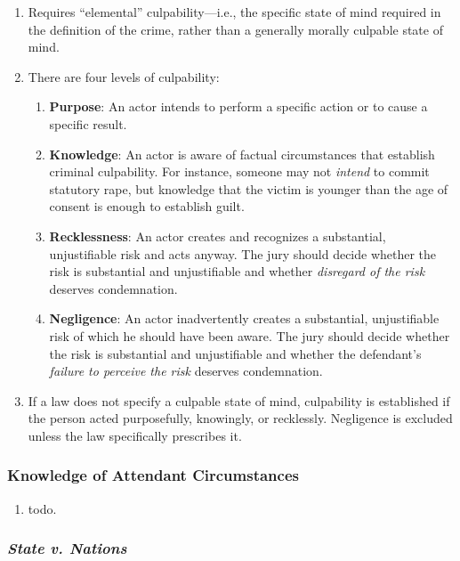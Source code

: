 \begin{enumerate}
    \item Requires ``elemental'' culpability---i.e., the specific state of mind required in the definition of the crime, rather than a generally morally culpable state of mind.
    \item There are four levels of culpability:
    \begin{enumerate}
        \item \textbf{Purpose}: An actor intends to perform a specific action or to cause a specific result.
        \item \textbf{Knowledge}: An actor is aware of factual circumstances that establish criminal culpability. For instance, someone may not \emph{intend} to commit statutory rape, but knowledge that the victim is younger than the age of consent is enough to establish guilt.
        \item \textbf{Recklessness}: An actor creates and recognizes a substantial, unjustifiable risk and acts anyway. The jury should decide whether the risk is substantial and unjustifiable and whether \emph{disregard of the risk} deserves condemnation. 
        \item \textbf{Negligence}: An actor inadvertently creates a substantial, unjustifiable risk of which he should have been aware. The jury should decide whether the risk is substantial and unjustifiable and whether the defendant's \emph{failure to perceive the risk} deserves condemnation.
    \end{enumerate}
    \item If a law does not specify a culpable state of mind, culpability is established if the person acted purposefully, knowingly, or recklessly. Negligence is excluded unless the law specifically prescribes it.
\end{enumerate}

\subsubsection{Knowledge of Attendant Circumstances}

\begin{enumerate}
    \item todo.
\end{enumerate}

\subsubsection{\emph{State v. Nations}}

